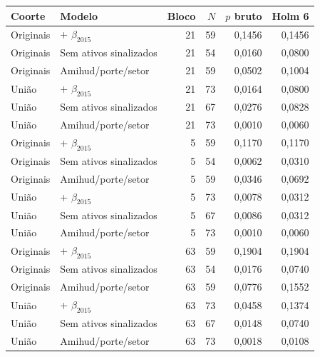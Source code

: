 \begin{tabular}{llrrrr}
\toprule
Coorte & Modelo & Bloco & $N$ & $p$ bruto & Holm 6\\
\midrule
Originais & + $\beta_{2015}$ & 21 & 59 & 0,1456 & 0,1456\\
Originais & Sem ativos sinalizados & 21 & 54 & 0,0160 & 0,0800\\
Originais & Amihud/porte/setor & 21 & 59 & 0,0502 & 0,1004\\
União & + $\beta_{2015}$ & 21 & 73 & 0,0164 & 0,0800\\
União & Sem ativos sinalizados & 21 & 67 & 0,0276 & 0,0828\\
União & Amihud/porte/setor & 21 & 73 & 0,0010 & 0,0060\\
\midrule
Originais & + $\beta_{2015}$ & 5 & 59 & 0,1170 & 0,1170\\
Originais & Sem ativos sinalizados & 5 & 54 & 0,0062 & 0,0310\\
Originais & Amihud/porte/setor & 5 & 59 & 0,0346 & 0,0692\\
União & + $\beta_{2015}$ & 5 & 73 & 0,0078 & 0,0312\\
União & Sem ativos sinalizados & 5 & 67 & 0,0086 & 0,0312\\
União & Amihud/porte/setor & 5 & 73 & 0,0010 & 0,0060\\
\midrule
Originais & + $\beta_{2015}$ & 63 & 59 & 0,1904 & 0,1904\\
Originais & Sem ativos sinalizados & 63 & 54 & 0,0176 & 0,0740\\
Originais & Amihud/porte/setor & 63 & 59 & 0,0776 & 0,1552\\
União & + $\beta_{2015}$ & 63 & 73 & 0,0458 & 0,1374\\
União & Sem ativos sinalizados & 63 & 67 & 0,0148 & 0,0740\\
União & Amihud/porte/setor & 63 & 73 & 0,0018 & 0,0108\\
\bottomrule
\end{tabular}
